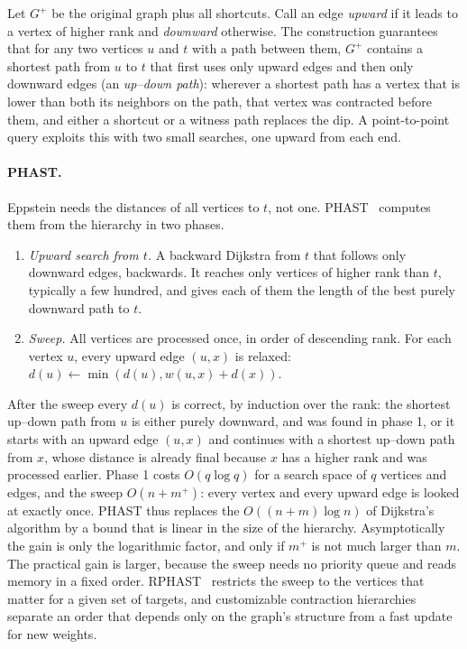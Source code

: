 \documentclass[11pt,a4paper]{article}
\begin{document}
Let $G^+$ be the original graph plus all shortcuts. Call an edge \emph{upward} if it leads to a vertex of higher
rank and \emph{downward} otherwise. The construction guarantees that for any two vertices $u$ and $t$ with a path
between them, $G^+$ contains a shortest path from $u$ to $t$ that first uses only upward edges and then only
downward edges (an \emph{up--down path}): wherever a shortest path has a vertex that is lower than both its
neighbors on the path, that vertex was contracted before them, and either a shortcut or a witness path replaces
the dip. A point-to-point query exploits this with two small searches, one upward from each end.

\paragraph{PHAST.} Eppstein needs the distances of all vertices to $t$, not one. PHAST~\cite{delling2013phast}
computes them from the hierarchy in two phases.
\begin{enumerate}
  \item \emph{Upward search from $t$.} A backward Dijkstra from $t$ that follows only downward edges, backwards. It
        reaches only vertices of higher rank than $t$, typically a few hundred, and gives each of them the length of
        the best purely downward path to $t$.
  \item \emph{Sweep.} All vertices are processed once, in order of descending rank. For each vertex $u$, every
        upward edge $(u,x)$ is relaxed: $d(u)\leftarrow\min(d(u),w(u,x)+d(x))$.
\end{enumerate}
After the sweep every $d(u)$ is correct, by induction over the rank: the shortest up--down path from $u$ is either
purely downward, and was found in phase 1, or it starts with an upward edge $(u,x)$ and continues with a shortest
up--down path from $x$, whose distance is already final because $x$ has a higher rank and was processed earlier. Phase 1 costs $O(q\log q)$ for a search space of $q$ vertices and edges, and the sweep $O(n+m^+)$: every vertex
and every upward edge is looked at exactly once. PHAST thus replaces the $O((n+m)\log n)$ of Dijkstra's algorithm
by a bound that is linear in the size of the hierarchy. Asymptotically the gain is only the logarithmic factor, and
only if $m^+$ is not much larger than $m$. The practical gain is larger, because the sweep needs no priority queue
and reads memory in a fixed order. RPHAST~\cite{delling2011rphast} restricts the sweep to the vertices that
matter for a given set of targets, and customizable contraction hierarchies~\cite{dibbelt2016} separate an order
that depends only on the graph's structure from a fast update for new weights.
\end{document}
